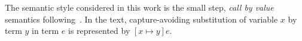 \documentclass[runningheads]{llncs}
\begin{document}
The semantic style considered in this work is the small step, {\it call by value} semantics following~\cite{plfa20.07}. In the text, capture-avoiding substitution of variable $x$ by term $y$ in term $e$ is represented by $[x \mapsto y]e$.


\end{document}
